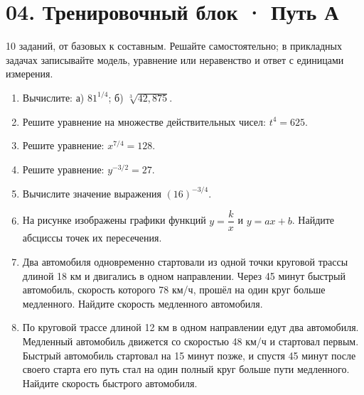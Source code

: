 \documentclass[a4paper,12pt]{article}
\newcommand{\ruleline}{\par\vspace{0.25em}{\color{accent!70}\hrule height 0.6pt}\vspace{0.7em}}
\begin{document}
\section*{04. Тренировочный блок · Путь А}
\ruleline
\textcolor{muted}{10 заданий, от базовых к составным. Решайте самостоятельно; в прикладных задачах записывайте модель, уравнение или неравенство и ответ с единицами измерения.}
\begin{enumerate}
\item Вычислите: а) $81^{1/4}$; б) $\sqrt[3]{42{,}875}$.
\item Решите уравнение на множестве действительных чисел: $t^4=625$.
\item Решите уравнение: $x^{7/4}=128$.
\item Решите уравнение: $y^{-3/2}={27}$.
\item Вычислите значение выражения $\left({16}\right)^{-3/4}$.
\item На рисунке изображены графики функций $y=\dfrac{k}{x}$ и $y=ax+b$. Найдите абсциссы точек их пересечения.
\begin{center}
\end{center}
\item Два автомобиля одновременно стартовали из одной точки круговой трассы длиной 18 км и двигались в одном направлении. Через 45 минут быстрый автомобиль, скорость которого 78 км/ч, прошёл на один круг больше медленного. Найдите скорость медленного автомобиля.
\item По круговой трассе длиной 12 км в одном направлении едут два автомобиля. Медленный автомобиль движется со скоростью 48 км/ч и стартовал первым. Быстрый автомобиль стартовал на 15 минут позже, и спустя 45 минут после своего старта его путь стал на один полный круг больше пути медленного. Найдите скорость быстрого автомобиля.

\end{enumerate}
\end{document}
